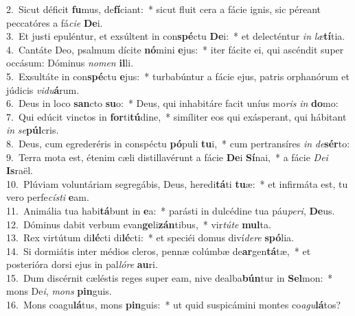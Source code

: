 {2.~}Sicut déficit \textbf{fu}mus, de\textbf{fí}ciant:~* sicut fluit cera a fácie ignis, sic péreant peccatóres a fá\textit{ci}\textit{e} \textbf{De}i.\\
{3.~}Et justi epuléntur, et exsúltent in con\textbf{spé}ctu \textbf{De}i:~* et delecténtur \textit{in} \textit{læ}\textbf{tí}tia.\\
{4.~}Cantáte Deo, psalmum dícite \textbf{nó}mini \textbf{e}jus:~* iter fácite ei, qui ascéndit super occásum: Dóminus \textit{no}\textit{men} \textbf{il}li.\\
{5.~}Exsultáte in con\textbf{spé}ctu \textbf{e}jus:~* turbabúntur a fácie ejus, patris orphanórum et júdicis \textit{vi}\textit{du}\textbf{á}rum.\\
{6.~}Deus in loco \textbf{san}cto \textbf{su}o:~* Deus, qui inhabitáre facit uníus mo\textit{ris} \textit{in} \textbf{do}mo:\\
{7.~}Qui edúcit vinctos in \textbf{for}ti\textbf{tú}dine,~* simíliter eos qui exásperant, qui hábitant \textit{in} \textit{se}\textbf{púl}cris.\\
{8.~}Deus, cum egrederéris in conspéctu \textbf{pó}puli \textbf{tu}i,~* cum pertransíres \textit{in} \textit{de}\textbf{sér}to:\\
{9.~}Terra mota est, étenim cæli distillavérunt a fácie \textbf{De}i \textbf{Sí}nai,~* a fácie \textit{De}\textit{i} \textbf{Is}raël.\\
{10.~}Plúviam voluntáriam segregábis, Deus, heredi\textbf{tá}ti \textbf{tu}æ:~* et infirmáta est, tu vero perfe\textit{cí}\textit{sti} \textbf{e}am.\\
{11.~}Animália tua habi\textbf{tá}bunt in \textbf{e}a:~* parásti in dulcédine tua páu\textit{pe}\textit{ri}, \textbf{De}us.\\
{12.~}Dóminus dabit verbum evan\textbf{ge}li\textbf{zán}tibus,~* vir\textit{tú}\textit{te} \textbf{mul}ta.\\
{13.~}Rex virtútum di\textbf{lé}cti di\textbf{lé}cti:~* et speciéi domus diví\textit{de}\textit{re} \textbf{spó}lia.\\
{14.~}Si dormiátis inter médios cleros, pennæ colúmbæ de\textbf{ar}gen\textbf{tá}tæ,~* et posterióra dorsi ejus in pal\textit{ló}\textit{re} \textbf{au}ri.\\
{15.~}Dum discérnit cæléstis reges super eam, nive dealba\textbf{bún}tur in \textbf{Sel}mon:~* mons De\textit{i}, \textit{mons} \textbf{pin}guis.\\
{16.~}Mons coagu\textbf{lá}tus, mons \textbf{pin}guis:~* ut quid suspicámini montes co\textit{a}\textit{gu}\textbf{lá}tos?\\
